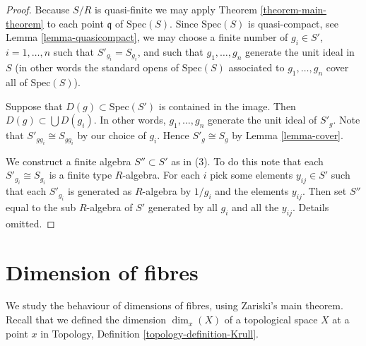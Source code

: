 \begin{proof}
Because $S/R$ is quasi-finite we may apply
Theorem \ref{theorem-main-theorem} to
each point $\mathfrak q$ of $\text{Spec}(S)$.
Since $\text{Spec}(S)$ is quasi-compact, see
Lemma \ref{lemma-quasicompact}, we may choose
a finite number of $g_i \in S'$, $i = 1, \ldots, n$
such that $S'_{g_i} = S_{g_i}$, and such that
$g_1, \ldots, g_n$ generate the unit ideal in $S$
(in other words the standard opens of $\text{Spec}(S)$ associated
to $g_1, \ldots, g_n$ cover all of $\text{Spec}(S)$).

\medskip\noindent
Suppose that $D(g) \subset \text{Spec}(S')$
is contained in the image. Then $D(g) \subset \bigcup D(g_i)$.
In other words, $g_1, \ldots, g_n$ generate the unit ideal of
$S'_g$. Note that $S'_{gg_i} \cong S_{gg_i}$ by our choice
of $g_i$. Hence $S'_g \cong S_g$ by Lemma \ref{lemma-cover}.

\medskip\noindent
We construct a finite algebra $S'' \subset S'$ as
in (3). To do this note that each $S'_{g_i} \cong S_{g_i}$
is a finite type $R$-algebra. For each $i$ pick
some elements $y_{ij} \in S'$ such that each
$S'_{g_i}$ is generated as $R$-algebra by $1/g_i$
and the elements $y_{ij}$. Then set $S''$
equal to the sub $R$-algebra of $S'$ generated by all $g_i$
and all the $y_{ij}$. Details omitted.
\end{proof}








































\section{Dimension of fibres}
\label{section-dimension-fibres}

\noindent
We study the behaviour of dimensions of fibres, using
Zariski's main theorem. Recall that we defined the
dimension $\dim_x(X)$ of a topological space $X$ at a point $x$
in Topology, Definition \ref{topology-definition-Krull}.

